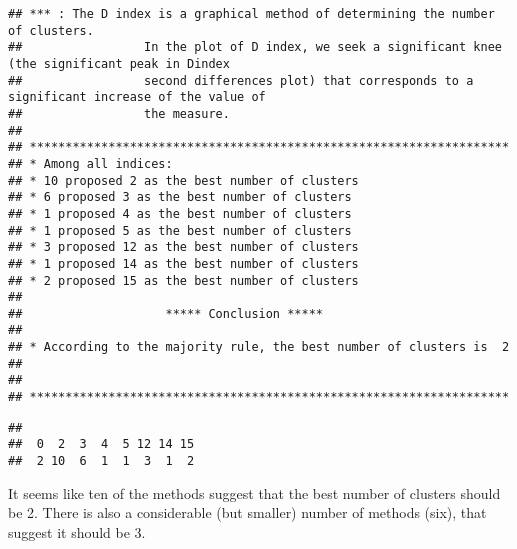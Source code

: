 \documentclass[
]{book}
\newenvironment{Shaded}{\begin{snugshade}}{\end{snugshade}}
\newcommand{\AttributeTok}[1]{\textcolor[rgb]{0.77,0.63,0.00}{#1}}
\newcommand{\DecValTok}[1]{\textcolor[rgb]{0.00,0.00,0.81}{#1}}
\newcommand{\FunctionTok}[1]{\textcolor[rgb]{0.00,0.00,0.00}{#1}}
\newcommand{\NormalTok}[1]{#1}
\newcommand{\SpecialCharTok}[1]{\textcolor[rgb]{0.00,0.00,0.00}{#1}}
\newcommand{\StringTok}[1]{\textcolor[rgb]{0.31,0.60,0.02}{#1}}
\begin{document}
\begin{verbatim}
## *** : The D index is a graphical method of determining the number of clusters. 
##                 In the plot of D index, we seek a significant knee (the significant peak in Dindex
##                 second differences plot) that corresponds to a significant increase of the value of
##                 the measure. 
##  
## ******************************************************************* 
## * Among all indices:                                                
## * 10 proposed 2 as the best number of clusters 
## * 6 proposed 3 as the best number of clusters 
## * 1 proposed 4 as the best number of clusters 
## * 1 proposed 5 as the best number of clusters 
## * 3 proposed 12 as the best number of clusters 
## * 1 proposed 14 as the best number of clusters 
## * 2 proposed 15 as the best number of clusters 
## 
##                    ***** Conclusion *****                            
##  
## * According to the majority rule, the best number of clusters is  2 
##  
##  
## *******************************************************************
\end{verbatim}

\begin{Shaded}
\end{Shaded}

\begin{verbatim}
## 
##  0  2  3  4  5 12 14 15 
##  2 10  6  1  1  3  1  2
\end{verbatim}

It seems like ten of the methods suggest that the best number of clusters should be 2. There is also a considerable (but smaller) number of methods (six), that suggest it should be 3.

\begin{Shaded}
\end{Shaded}
\end{document}
